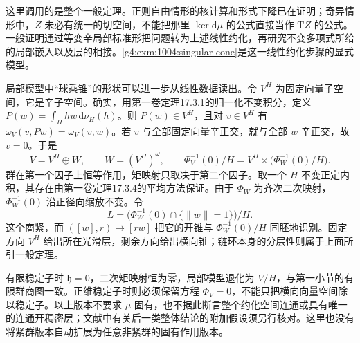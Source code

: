 这里调用的是整个一般定理。正则自由情形的核计算和形式下降已在证明；奇异情形中，\(Z\) 未必有统一的切空间，不能把那里 \(\ker\mathrm{d}\mu\) 的公式直接当作 \(\mathrm{T}Z\) 的公式。一般证明通过等变辛局部标准形把问题转为上述线性约化，再研究不变多项式所给的局部嵌入以及层的相接。\cref{g4:exm:1004:singular-cone}是这一线性约化步骤的显式模型。

\ProseParagraphBreak

局部模型中“球乘锥”的形状可以进一步从线性数据读出。令 \(V^H\) 为固定向量子空间，它是辛子空间。确实，用第一卷定理17.3.1的归一化不变积分，定义 \(P(w)=\int_H hw\,\mathrm{d}\nu_H(h)\)。则 \(P(w)\in V^H\)，且对 \(v\in V^H\) 有 \(\omega_V(v,Pw)=\omega_V(v,w)\)。若 \(v\) 与全部固定向量辛正交，就与全部 \(w\) 辛正交，故 \(v=0\)。于是
\[
	V=V^H\oplus W,\qquad W=(V^H)^\omega,
	\qquad \Phi_V^{-1}(0)/H=V^H\times\bigl(\Phi_W^{-1}(0)/H\bigr).
\]
群在第一个因子上恒等作用，矩映射只取决于第二个因子。取一个 \(H\) 不变正定内积，其存在由第一卷定理17.3.4的平均方法保证。由于 \(\Phi_W\) 为齐次二次映射，\(\Phi_W^{-1}(0)\) 沿正径向缩放不变。令
\[
	L=\bigl(\Phi_W^{-1}(0)\cap\{\|w\|=1\}\bigr)/H.
\]
这个商紧，而 \(([w],r)\mapsto[rw]\) 把它的开锥与 \(\Phi_W^{-1}(0)/H\) 同胚地识别。固定方向 \(V^H\) 给出所在光滑层，剩余方向给出横向锥；链环本身的分层性则属于上面所引一般定理。

\ProseParagraphBreak

有限稳定子时 \(\mathfrak h=0\)，二次矩映射恒为零，局部模型退化为 \(V/H\)，与第一小节的有限群商图一致。正维稳定子时则必须保留方程 \(\Phi_V=0\)，不能只把横向向量空间除以稳定子。以上版本不要求 \(\mu\) 固有，也不据此断言整个约化空间连通或具有唯一的连通开稠密层；文献中有关后一类整体结论的附加假设须另行核对。这里也没有将紧群版本自动扩展为任意非紧群的固有作用版本。
